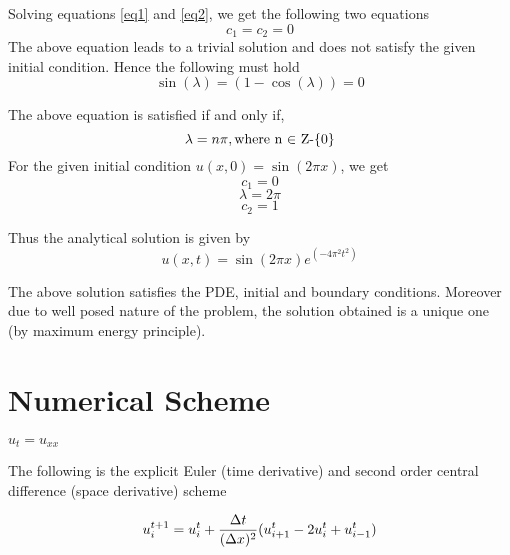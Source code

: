\documentclass[12pt]{article}
\begin{document}
	Solving equations \ref{eq1} and \ref{eq2}, we get the following two equations
	\begin{equation}
	c_1=c_2=0
	\end{equation}
	 The above equation leads to a trivial solution and does not satisfy the given initial condition. Hence the following must hold 
	 \begin{equation}
	 \sin(\lambda)=(1-\cos(\lambda))=0
	 \end{equation}
	
	The above equation is satisfied if and only if,	
	\begin{equation}
	\lambda = n \pi, \\ \text{where n $\in$ Z-\{0\}}
	\end{equation}	
	For the given initial condition $u(x,0)=\sin(2 \pi x)$, we get	
	\begin{equation}
	c_1 = 0
	\end{equation}	
	\begin{equation}
	\lambda = 2\pi
	\end{equation}		
	\begin{equation}
	c_2 = 1
	\end{equation}
	
	Thus the analytical solution is given by	
	\begin{equation}
	u(x,t)= \sin(2 \pi x) e^{(-4 \pi^2 t^2)}
	\end{equation}
	
	The above solution satisfies the PDE, initial and boundary conditions. Moreover due to well posed nature of the problem, the solution obtained is a unique one (by maximum energy principle).
	
	\section{Numerical Scheme}
	
	\begin{center}
		$u_t=u_{xx}$
	\end{center}
	
	The following is the explicit Euler (time derivative) and second order central difference (space derivative) scheme
	
	\begin{center}
		\begin{equation}
		u^{t+1}_{i}= u^t_i + {\Delta t \over (\Delta x)^2} (u^t_{i+1}-2u^t_i+u^t_{i-1})
		\end{equation} 
	\end{center}
\end{document}
